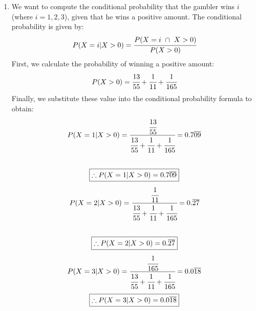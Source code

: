 \documentclass{article}
\begin{document}
\begin{enumerate}
\newpage
\item 
  We want to compute the conditional probability that the gambler wins $i$ (where $i = 1, 2, 3$), given that he wins a positive amount. The conditional probability is given by:
  \[
  P(X = i | X > 0) = \cfrac{P(X=i\  \cap\  X>0)}{P(X > 0)}
  \]
  First, we calculate the probability of winning a positive amount:
  \[
  P(X > 0) = \cfrac{13}{55} + \cfrac{1}{11} + \cfrac{1}{165}
  \]
  Finally, we substitute these value into the conditional probability formula to obtain:
  \begin{align*}
    P(X = 1 | X > 0) = \cfrac{\cfrac{13}{55}}{\cfrac{13}{55} + \cfrac{1}{11} + \cfrac{1}{165}} = 0.7\overline{09}\\\\
  \end{align*}
  \[
    \boxed{\therefore P(X = 1 | X > 0) = 0.7\overline{09}}\\
  \]
  \begin{align*}
    P(X = 2 | X > 0) = \cfrac{\cfrac{1}{11}}{\cfrac{13}{55} + \cfrac{1}{11} + \cfrac{1}{165}} = 0.\overline{27}\\\\
  \end{align*}
  \[
     \boxed{\therefore P(X = 2 | X > 0) = 0.\overline{27}}\\
  \]
  \begin{align*}
    P(X = 3 | X > 0) = \cfrac{\cfrac{1}{165}}{\cfrac{13}{55} + \cfrac{1}{11} + \cfrac{1}{165}} = 0.0\overline{18}\\
  \end{align*}
  \[
     \boxed{\therefore P(X = 3 | X > 0) = 0.0\overline{18}}\\
  \]
\end{enumerate}
\end{document}
